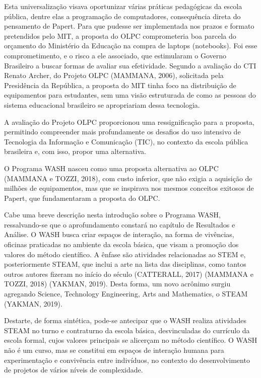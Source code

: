 Esta universalização visava oportunizar várias práticas pedagógicas da escola pública, dentre elas a programação de computadores, consequência direta do pensamento de Papert. Para que pudesse ser implementada nos prazos e formato pretendidos pelo MIT, a proposta do OLPC comprometeria boa parcela do orçamento do Ministério da Educação na compra de laptops (notebooks). Foi esse comprometimento, e o risco a ele associado, que estimularam o Governo Brasileiro a buscar formas de avaliar sua efetividade. Segundo a avaliação do CTI Renato Archer, do Projeto OLPC  (MAMMANA, 2006), solicitada pela Presidência da República, a proposta do MIT tinha foco na distribuição de equipamentos para estudantes, sem uma visão estruturada de como as pessoas do sistema educacional brasileiro se apropriariam dessa tecnologia.

A avaliação do Projeto OLPC proporcionou uma ressignificação para a proposta, permitindo compreender mais profundamente os desafios do uso intensivo de Tecnologia da Informação e Comunicação (TIC), no contexto da escola pública brasileira e, com isso, propor uma alternativa.

O Programa WASH nasceu como uma proposta alternativa ao OLPC (MAMMANA e TOZZI, 2018), com custo inferior, que não exigia a aquisição de milhões de equipamentos, mas que se inspirava nos mesmos conceitos exitosos de Papert, que fundamentaram a proposta do OLPC.

Cabe uma breve descrição nesta introdução sobre o Programa WASH, ressalvando-se que o aprofundamento constará no capítulo de Resultados e Análise. O WASH busca criar espaços de interação, na forma de  vivências, oficinas praticadas no ambiente da escola básica, que visam a promoção dos valores do método científico. A ênfase são atividades relacionadas ao STEM e, posteriormente STEAM, que inclui a arte na lista das disciplinas, como tantos outros autores fizeram no início do século (CATTERALL, 2017) (MAMMANA e TOZZI, 2018)  (YAKMAN, 2019). Desta forma, um novo acrônimo surgiu agregando Science, Technology Engineering, Arts and Mathematics, o STEAM (YAKMAN, 2019).

Destarte, de forma sintética, pode-se antecipar que o WASH realiza atividades STEAM no turno e contraturno da escola básica, desvinculadas do currículo da escola formal, cujos valores principais se alicerçam no método científico. O WASH não é um curso, mas se constitui em espaços de interação humana para experimentação e convivência entre indivíduos, no contexto do desenvolvimento de projetos de vários níveis de complexidade.

